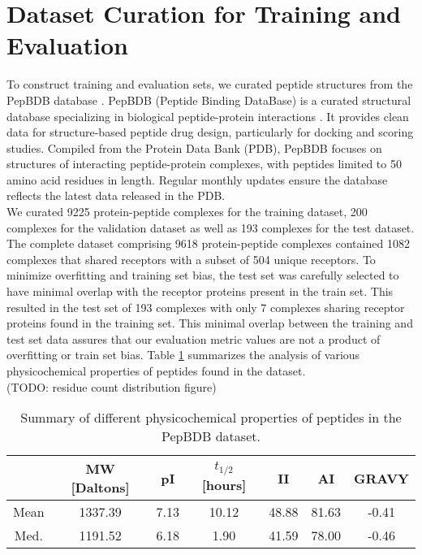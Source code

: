 \section{Dataset Curation for Training and Evaluation}
To construct training and evaluation sets, we curated peptide structures from the PepBDB database \cite{Wen2019}. PepBDB (Peptide Binding DataBase) is a curated structural database specializing in biological peptide-protein interactions \cite{Wen2019}. It provides clean data for structure-based peptide drug design, particularly for docking and scoring studies. Compiled from the Protein Data Bank (PDB), PepBDB focuses on structures of interacting peptide-protein complexes, with peptides limited to 50 amino acid residues in length. Regular monthly updates ensure the database reflects the latest data released in the PDB. \\

We curated 9225 protein-peptide complexes for the training dataset, 200 complexes for the validation dataset as well as 193 complexes for the test dataset. The complete dataset comprising 9618 protein-peptide complexes contained 1082 complexes that shared receptors with a subset of 504 unique receptors. To minimize overfitting and training set bias, the test set was carefully selected to have minimal overlap with the receptor proteins present in the train set. This resulted in the test set of 193 complexes with only 7 complexes sharing receptor proteins found in the training set. This minimal overlap between the training and test set data assures that our evaluation metric values are not a product of overfitting or train set bias. Table \ref{tab:pepbdb_pc_metrics} summarizes the analysis of various physicochemical properties of peptides found in the dataset. \\
(TODO: residue count distribution figure)

\begin{table}[ht]
\centering
\renewcommand{\arraystretch}{1.5}
\begin{tabular}{|c|c|c|c|c|c|c|}
      \hline
      & \multicolumn{1}{c|}{MW [Daltons]} & \multicolumn{1}{c|}{pI} & \multicolumn{1}{c|}{$t_{1/2}$ [hours]} & \multicolumn{1}{c|}{II} & \multicolumn{1}{c|}{AI} & \multicolumn{1}{c|}{GRAVY}\\
      \hline
      Mean          & 1337.39 & 7.13 & 10.12 & 48.88 & 81.63 & -0.41 \\
      Med.          & 1191.52 & 6.18 & 1.90 & 41.59 & 78.00 & -0.46 \\
      \hline
\end{tabular}
\renewcommand{\arraystretch}{1}
\caption{Summary of different physicochemical properties of peptides in the PepBDB dataset.}
\label{tab:pepbdb_pc_metrics}
\end{table}

